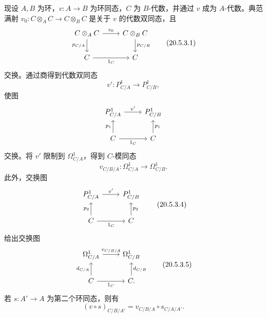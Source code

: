 现设 $A,B$ 为环，$v:A\to B$ 为环同态，$C$ 为 $B$-代数，并通过 $v$ 成为 $A$-代数。典范满射 $v_0:C\otimes_A C\to C\otimes_B C$ 是关于 $v$ 的代数双同态，且
\begin{equation}
\begin{tikzcd}
 C\otimes_A C\arrow[r,"v_0"]\arrow[d,"p_{C/A}"']&C\otimes_B C\arrow[d,"p_{C/B}"]\\
 C\arrow[r,"1_C"']&C
\end{tikzcd}
\tag{20.5.3.1}
\end{equation}
交换。通过商得到代数双同态
\begin{equation}
 v':P^1_{C/A}\longrightarrow P^1_{C/B},
 \tag{20.5.3.2}
\end{equation}
使图
\[
\begin{tikzcd}
 P^1_{C/A}\arrow[r,"v'"]&P^1_{C/B}\\
 C\arrow[u,"p_1"]\arrow[r,"1_C"']&C\arrow[u,"p_1"']
\end{tikzcd}
\]
交换。将 $v'$ 限制到 $\Omega^1_{C/A}$，得到 $C$-模同态
\begin{equation}
 v_{C/B/A}:\Omega^1_{C/A}\longrightarrow\Omega^1_{C/B}.
 \tag{20.5.3.3}
\end{equation}
此外，交换图
\begin{equation}
\begin{tikzcd}
 P^1_{C/A}\arrow[r,"v'"]&P^1_{C/B}\\
 C\arrow[u,"p_2"]\arrow[r,"1_C"']&C\arrow[u,"p_2"']
\end{tikzcd}
\tag{20.5.3.4}
\end{equation}
给出交换图
\begin{equation}
\begin{tikzcd}
 \Omega^1_{C/A}\arrow[r,"v_{C/B/A}"]&\Omega^1_{C/B}\\
 C\arrow[u,"d_{C/A}"]\arrow[r,"1_C"']&C\arrow[u,"d_{C/B}"'].
\end{tikzcd}
\tag{20.5.3.5}
\end{equation}
若 $s:A'\to A$ 为第二个环同态，则有
\begin{equation}
 (v\circ s)_{C/B/A'}=v_{C/B/A}\circ s_{C/A/A'}.
 \tag{20.5.3.6}
\end{equation}

